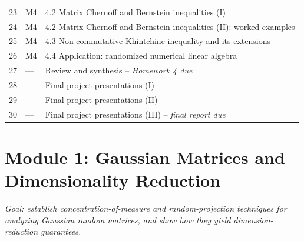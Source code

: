 \documentclass[11pt]{article}
\begin{document}
\begin{longtable}{p{1.4cm}p{1.4cm}p{9.5cm}}
23 & M4 & 4.2 Matrix Chernoff and Bernstein inequalities (I) \\
24 & M4 & 4.2 Matrix Chernoff and Bernstein inequalities (II): worked examples \\
25 & M4 & 4.3 Non-commutative Khintchine inequality and its extensions \\
26 & M4 & 4.4 Application: randomized numerical linear algebra \\
27 & --- & Review and synthesis -- \emph{Homework 4 due} \\
28 & --- & Final project presentations (I) \\
29 & --- & Final project presentations (II) \\
30 & --- & Final project presentations (III) -- \emph{final report due} \\
\bottomrule
\end{longtable}

\section{Module 1: Gaussian Matrices and Dimensionality Reduction}
\emph{Goal: establish concentration-of-measure and random-projection techniques for analyzing Gaussian random matrices, and show how they yield dimension-reduction guarantees.}
\end{document}
